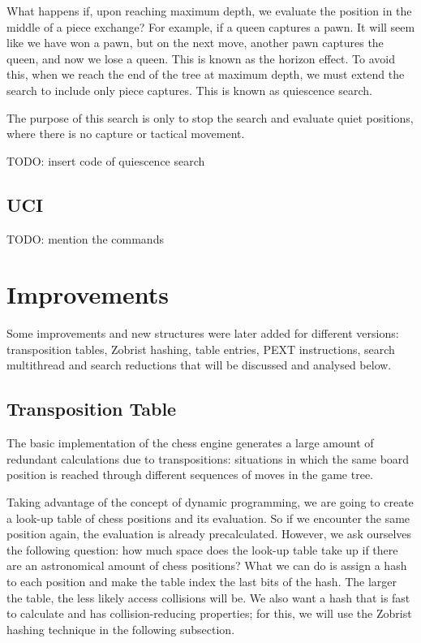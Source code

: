 What happens if, upon reaching maximum depth, we evaluate the position in the middle of a piece exchange? For example, if a queen captures a pawn. It will seem like we have won a pawn, but on the next move, another pawn captures the queen, and now we lose a queen. This is known as the horizon effect. To avoid this, when we reach the end of the tree at maximum depth, we must extend the search to include only piece captures. This is known as quiescence search.

\vspace{1em}

\noindent The purpose of this search is only to stop the search and evaluate quiet positions, where there is no capture or tactical movement.

\vspace{1em}

TODO: insert code of quiescence search

\subsection{UCI}

TODO: mention the commands

\section{Improvements}

Some improvements and new structures were later added for different versions: transposition tables, Zobrist hashing, table entries, PEXT instructions, search multithread and search reductions that will be discussed and analysed below.

\subsection{Transposition Table}
\label{sec:tt}

The basic implementation of the chess engine generates a large amount of redundant calculations due to transpositions: situations in which the same board position is reached through different sequences of moves in the game tree.

\vspace{1em}

\noindent Taking advantage of the concept of dynamic programming, we are going to create a look-up table of chess positions and its evaluation. So if we encounter the same position again, the evaluation is already precalculated. However, we ask ourselves the following question: how much space does the look-up table take up if there are an astronomical amount of chess positions? What we can do is assign a hash to each position and make the table index the last bits of the hash. The larger the table, the less likely access collisions will be. We also want a hash that is fast to calculate and has collision-reducing properties; for this, we will use the Zobrist hashing technique in the following subsection.

